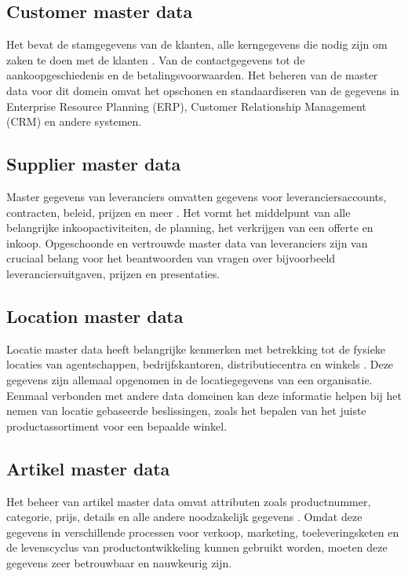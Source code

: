 \subsection{Customer master data}
Het bevat de stamgegevens van de klanten, alle kerngegevens die nodig zijn om zaken te doen met de klanten \autocite{SAPMasterData}. Van de contactgegevens tot de aankoopgeschiedenis en de betalingsvoorwaarden. Het beheren van de master data voor dit domein omvat het opschonen en standaardiseren van de gegevens in Enterprise Resource Planning (ERP), Customer Relationship Management (CRM) en andere systemen.

\subsection{Supplier master data}
Master gegevens van leveranciers omvatten gegevens voor leveranciersaccounts, contracten, beleid, prijzen en meer \autocite{SAPMasterData}. Het vormt het middelpunt van alle belangrijke inkoopactiviteiten, de planning, het verkrijgen van een offerte en inkoop. Opgeschoonde en vertrouwde master data van leveranciers zijn van cruciaal belang voor het beantwoorden van vragen over bijvoorbeeld leveranciersuitgaven, prijzen en presentaties. 

\subsection{Location master data}
Locatie master data heeft belangrijke kenmerken met betrekking tot de fysieke locaties van agentschappen, bedrijfskantoren, distributiecentra en winkels \autocite{SAPMasterData}. Deze gegevens zijn allemaal opgenomen in de locatiegegevens van een organisatie. Eenmaal verbonden met andere data domeinen kan deze informatie helpen bij het nemen van locatie gebaseerde beslissingen, zoals het bepalen van het juiste productassortiment voor een bepaalde winkel.

\subsection{Artikel master data}
Het beheer van artikel master data omvat attributen zoals productnummer, categorie, prijs, details en alle andere noodzakelijk gegevens \autocite{SAPMasterData}. Omdat deze gegevens in verschillende processen voor verkoop, marketing, toeleveringsketen en de levenscyclus van productontwikkeling kunnen gebruikt worden, moeten deze gegevens zeer betrouwbaar en nauwkeurig zijn.

